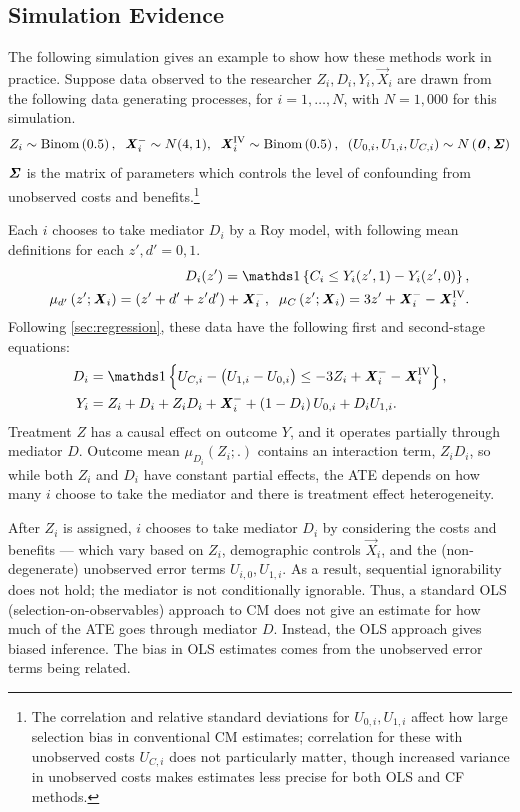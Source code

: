 \subsection{Simulation Evidence}
\label{sec:simulations}
The following simulation gives an example to show how these methods work in practice.
Suppose data observed to the researcher $Z_i, D_i, Y_i, \vec X_i$ are drawn from the following data generating processes, for $i = 1, \hdots, N$, with 
$N = 1,000$ for this simulation.
\[ Z_i \sim \text{Binom}\left(0.5 \right),
    \;\; \boldsymbol{\mathit{X}}_i^- \sim N(4, 1),
    \;\; \boldsymbol{\mathit{X}}_i^{\text{IV}} \sim \text{Binom}\left( 0.5 \right),
    \;\; \left( U_{0,i}, U_{1,i}, U_{C,i} \right) \sim
    N\left( \boldsymbol{\mathit{0}}, \boldsymbol{\mathit{\Sigma}} \right) \]
$\boldsymbol{\mathit{\Sigma}}$ is the matrix of parameters which controls the level of confounding from unobserved costs and benefits.\footnote{
    The correlation and relative standard deviations for $U_{0,i}, U_{1,i}$ affect how large selection bias in conventional CM estimates; correlation for these with unobserved costs $U_{C,i}$ does not particularly matter, though increased variance in unobserved costs makes estimates less precise for both OLS and CF methods.
}

Each $i$ chooses to take mediator $D_i$ by a Roy model, with following mean definitions for each $z', d' = 0, 1$.
\begin{align*}
    D_i(z') = \indicator{C_i \leq Y_i(z', 1) - Y_i(z', 0)},  \\
    \mu_{d'}\left(z' ; \vec X_i \right) = \left( z' + d' + z' d' \right) + \vec X_i^-,
    \;\; \mu_{C}\left(z' ; \vec X_i \right) = 3z' + \vec X_i^- - \vec X_i^{\text{IV}}.
\end{align*}
Following \autoref{sec:regression}, these data have the following first and second-stage equations:
\begin{align*}
    D_i &= \indicator{U_{C,i} - \big( U_{1,i} - U_{0,i} \big)
    \leq -3Z_i + \vec X_i^- - \vec X_i^{\text{IV}}},  \\
    Y_i &= Z_i + D_i + Z_i D_i + \vec X_i^-
        + \left( 1 - D_i \right) U_{0,i} + D_i U_{1,i}.
\end{align*}
Treatment $Z$ has a causal effect on outcome $Y$, and it operates partially through mediator $D$.
Outcome mean $\mu_{D_i}(Z_i;.)$ contains an interaction term, $Z_i D_i$, so while both $Z_i$ and $D_i$ have constant partial effects, the ATE depends on how many $i$ choose to take the mediator and there is treatment effect heterogeneity.

After $Z_i$ is assigned, $i$ chooses to take mediator $D_i$ by considering the costs and benefits --- which vary based on $Z_i$, demographic controls $\vec X_i$, and the (non-degenerate) unobserved error terms $U_{i,0}, U_{1,i}$.
As a result, sequential ignorability does not hold; the mediator is not conditionally ignorable.
Thus, a standard OLS (selection-on-observables) approach to CM does not give an estimate for how much of the ATE goes through mediator $D$.
Instead, the OLS approach gives biased inference.
The bias in OLS estimates comes from the unobserved error terms being related.

